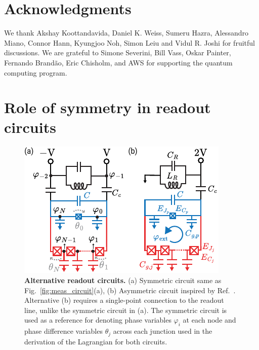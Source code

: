 \documentclass[%
reprint,
superscriptaddress,
 amsmath,amssymb,
 aps,
 prx,
longbibliography,
floatfix,
]{revtex4-2}
\begin{document}
\section{Acknowledgments}
 We thank Akshay Koottandavida, Daniel K. Weiss, Sumeru Hazra, Alessandro Miano, Connor Hann, Kyungjoo Noh, Simon Leiu and Vidul R. Joshi for fruitful discussions. We are grateful to Simone Severini, Bill Vass, Oskar Painter, Fernando Brand\~ao, Eric Chisholm, and AWS for supporting the quantum computing program. %
\appendix
\section{Role of symmetry in readout circuits}\label{app:alt_circuits}
\begin{figure}[t]
    \centering
    \includegraphics[width=\linewidth]{Supp_Fig/Circuit_choice.pdf}
    \caption{{\bf Alternative readout circuits.} (a) Symmetric circuit same as Fig.~\ref{fig:meas_circuit}(a), (b) Asymmetric circuit inspired by Ref.~\cite{zhang_universal_2021}. Alternative (b) requires a single-point connection to the readout line, unlike the symmetric circuit in (a). The symmetric circuit is used as a reference for denoting phase variables $\varphi_i$ at each node and phase difference variables $\theta_j$ across each junction used in the derivation of the Lagrangian for both circuits.}
    \label{fig:circuit_choice}
\end{figure}
\end{document}
